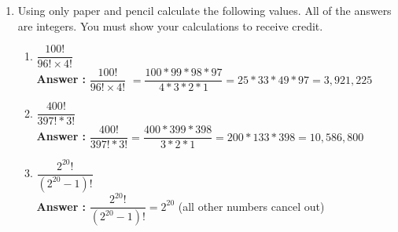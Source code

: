 \documentclass[a4paper,11pt]{article}
\newcommand{\answer}{\textbf{Answer : }}
\begin{document}
\begin{enumerate}
\begin{enumerate}
  \item How many student ID numbers have only odd numbers? \\
  \answer $5^7 =78125$

  \item How many student ID numbers have only even numbers? \\
  \answer $4 \times 5^6 = 62,500$

  \item How many student ID numbers start and end with the same digit? \\
  \answer $9 \times 10 \times 10 \times 10 \times 10 \times 1 = 900,000$

  \item How many student ID numbers start and end with different digits? \\
  \answer $9,000,000 \text{(total)} - 900,000 = 8,100,000$

  \item How many student ID numbers have no repeated digits? \\
  \answer $9 \times 9 \times 8 \times 7 \times 6 \times 5 \times 4 = 544,320$

  \item How many student ID numbers are palindromes? \\
  \answer $9 \times 10 \times 10 \times 10 \times 1 \times 1 \times 1 = 9000$

  \end{enumerate}



\item Using only paper and pencil calculate the following values. All of the answers are integers.
You must show your calculations to receive credit.

  \begin{enumerate}
  \item $\dfrac{100!}{96! \times 4!}$\vspace{10pt} \\
  \answer $\dfrac{100!}{96! \times 4!}$\vspace{10pt} $= \dfrac{100*99*98*97}{4*3*2*1} = 25*33*49*97 = 3,921,225$

  \item $\dfrac{400!}{397!*3!}$ \\
  \answer $ \dfrac{400!}{397!*3!} = \dfrac{400*399*398}{3*2*1} = 200*133*398 = 10,586,800$

  \item $\dfrac{2^{20}!}{(2^{20}-1)!}$ \\
  \answer $ \dfrac{2^{20}!}{(2^{20}-1)!} = 2^{20}$ (all other numbers cancel out)
  \end{enumerate}


\end{enumerate}
\end{document}
